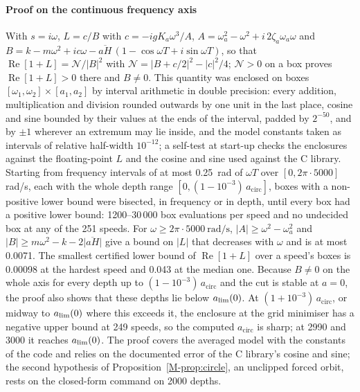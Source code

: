 \paragraph{Proof on the continuous frequency axis} With $s=i\omega$, $L=c/B$ with $c=-igK_a\omega^3/A$, $A=\omega_a^2-\omega^2+i\,2\zeta_a\omega_a\omega$ and $B=k-m\omega^2+ic\omega-\overline{aH}\,(1-\cos\omega T+i\sin\omega T)$, so that $\operatorname{Re}[1+L]=\mathcal N/\lvert B\rvert^2$ with $\mathcal N=\lvert B+c/2\rvert^2-\lvert c\rvert^2/4$; $\mathcal N>0$ on a box proves $\operatorname{Re}[1+L]>0$ there and $B\neq0$. This quantity was enclosed on boxes $[\omega_1,\omega_2]\times[a_1,a_2]$ by interval arithmetic in double precision: every addition, multiplication and division rounded outwards by one unit in the last place, cosine and sine bounded by their values at the ends of the interval, padded by $2^{-50}$, and by $\pm1$ wherever an extremum may lie inside, and the model constants taken as intervals of relative half-width $10^{-12}$; a self-test at start-up checks the enclosures against the floating-point $L$ and the cosine and sine used against the C library. Starting from frequency intervals of at most \SI{0.25}{\radian} of $\omega T$ over $[0,2\pi\cdot5000]$\,rad/s, each with the whole depth range $[0,(1-10^{-3})\,a_{\mathrm{circ}}]$, boxes with a non-positive lower bound were bisected, in frequency or in depth, until every box had a positive lower bound: 1200--30\,000 box evaluations per speed and no undecided box at any of the 251 speeds. For $\omega\ge2\pi\cdot\SI{5000}{\radian\per\second}$, $\lvert A\rvert\ge\omega^2-\omega_a^2$ and $\lvert B\rvert\ge m\omega^2-k-2\lvert\overline{aH}\rvert$ give a bound on $\lvert L\rvert$ that decreases with $\omega$ and is at most 0.0071. The smallest certified lower bound of $\operatorname{Re}[1+L]$ over a speed's boxes is 0.00098 at the hardest speed and 0.043 at the median one. Because $B\neq0$ on the whole axis for every depth up to $(1-10^{-3})\,a_{\mathrm{circ}}$ and the cut is stable at $a=0$, the proof also shows that these depths lie below $a_{\lim}(0)$. At $(1+10^{-3})\,a_{\mathrm{circ}}$, or midway to $a_{\lim}(0)$ where this exceeds it, the enclosure at the grid minimiser has a negative upper bound at 249 speeds, so the computed $a_{\mathrm{circ}}$ is sharp; at 2990 and \SI{3000}{\rpm} it reaches $a_{\lim}(0)$. The proof covers the averaged model with the constants of the code and relies on the documented error of the C library's cosine and sine; the second hypothesis of Proposition~\ref{M-prop:circle}, an unclipped forced orbit, rests on the closed-form command on 2000 depths.

